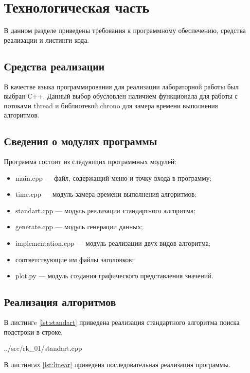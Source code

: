 \section{Технологическая часть}
В данном разделе приведены требования к программному обеспечению, средства реализации и листинги кода.

\subsection{Средства реализации}
В качестве языка программирования для реализации лабораторной работы был выбран C++.
Данный выбор обусловлен наличием функционала для работы с потоками thread и библиотекой chrono для замера времени выполнения алгоритмов.

\subsection{Сведения о модулях программы}
Программа состоит из следующих программных модулей:
\begin{itemize}
	\item main.cpp --- файл, содержащий меню и точку входа в программу;
	\item time.cpp --- модуль замера времени выполнения алгоритмов;
	\item standart.cpp --- модуль реализации стандартного алгоритма;
	\item generate.cpp --- модуль генерации данных;
	\item implementation.cpp --- модуль реализации двух видов алгоритма;
	\item соответствующие им файлы заголовков;
	\item plot.py --- модуль создания графического представления значений.
\end{itemize}

\newpage
\subsection{Реализация алгоритмов}

В листингe \ref{lst:standart} приведена реализация стандартного алгоритма поиска подстроки в строке.

\begin{lstinputlisting}[
	label={lst:standart},
	caption={Стандартный алгоритм},
	firstline=11,
	lastline=26
	]{../src/rk_01/standart.cpp}
\end{lstinputlisting}

В листингах \ref{lst:linear} приведена последовательная реализация программы.

